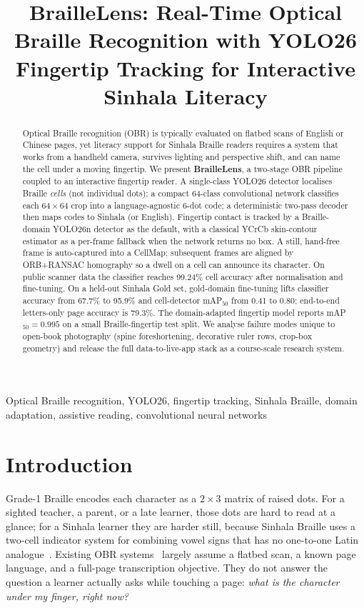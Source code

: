 \documentclass[conference]{IEEEtran}
\title{BrailleLens: Real-Time Optical Braille Recognition
with YOLO26 Fingertip Tracking for Interactive Sinhala Literacy}
\author{
\IEEEauthorblockN{Group 15}
\IEEEauthorblockA{\textit{CS3501 Data Science and Engineering Project}\\
\textit{BrailleLens}\\
}
}
\begin{document}
\maketitle

\begin{abstract}
Optical Braille recognition (OBR) is typically evaluated on flatbed scans of
English or Chinese pages, yet literacy support for Sinhala Braille readers
requires a system that works from a handheld camera, survives lighting and
perspective shift, and can name the cell under a moving fingertip. We present
\textbf{BrailleLens}, a two-stage OBR pipeline coupled to an interactive
fingertip reader. A single-class YOLO26 detector localises Braille
\textit{cells} (not individual dots); a compact 64-class convolutional network
classifies each $64\times 64$ crop into a language-agnostic 6-dot code; a
deterministic two-pass decoder then maps codes to Sinhala (or English).
Fingertip contact is tracked by a Braille-domain YOLO26n detector as the
default, with a classical YCrCb skin-contour estimator as a per-frame
fallback when the network returns no box. A still, hand-free frame is
auto-captured into a CellMap; subsequent frames are aligned by ORB+RANSAC
homography so a dwell on a cell can announce its character. On public
scanner data the classifier reaches 99.24\% cell accuracy after
normalisation and fine-tuning. On a held-out Sinhala Gold set, gold-domain
fine-tuning lifts classifier accuracy from 67.7\% to 95.9\% and cell-detector
mAP$_{50}$ from 0.41 to 0.80; end-to-end letters-only page accuracy is
79.3\%. The domain-adapted fingertip model reports mAP$_{50}=0.995$ on a
small Braille-fingertip test split. We analyse failure modes unique to
open-book photography (spine foreshortening, decorative ruler rows, crop-box
geometry) and release the full data-to-live-app stack as a course-scale
research system.
\end{abstract}

\begin{IEEEkeywords}
Optical Braille recognition, YOLO26, fingertip tracking, Sinhala Braille,
domain adaptation, assistive reading, convolutional neural networks
\end{IEEEkeywords}

\section{Introduction}
\label{sec:intro}

Grade-1 Braille encodes each character as a $2\times 3$ matrix of raised
dots. For a sighted teacher, a parent, or a late learner, those dots are
hard to read at a glance; for a Sinhala learner they are harder still,
because Sinhala Braille uses a two-cell indicator system for combining
vowel signs that has no one-to-one Latin analogue~\cite{unicode-sinhala}.
Existing OBR systems~\cite{li2018dsbi,ovodov2021obr} largely assume a
flatbed scan, a known page language, and a full-page transcription
objective. They do not answer the question a learner actually asks while
touching a page: \emph{what is the character under my finger, right now?}
\end{document}
